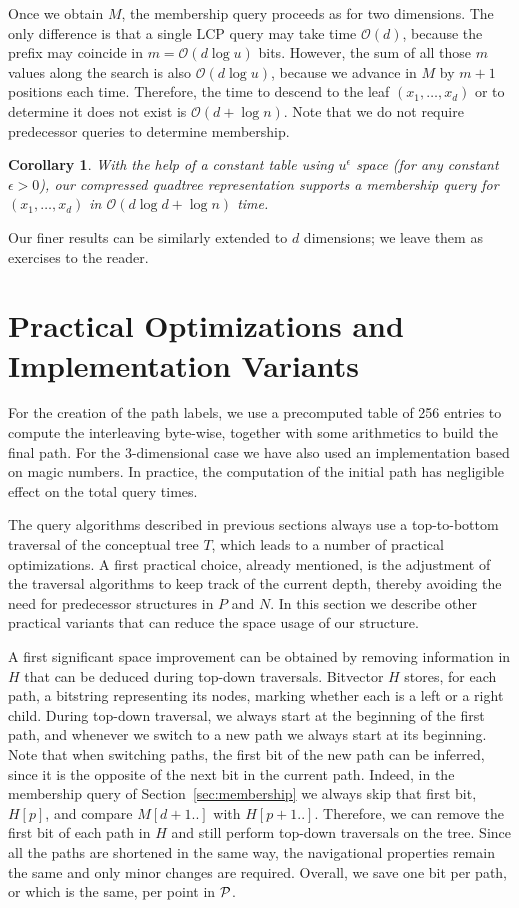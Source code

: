 \documentclass{elsarticle}
\newtheorem{corollary}[theorem]{Corollary}
\newcommand{\Oh}[1]
  {\ensuremath{\mathcal{O}\!\left( {#1} \right)}}
\newcommand{\LCP}{\ensuremath{\mathrm{LCP}}}
\begin{document}
Once we obtain $M$, the membership query proceeds as for two dimensions. The only difference is that a single $\LCP$ query may take time $\Oh{d}$, because the prefix may coincide in $m=\Oh{d\log u}$ bits. However, the sum of all those $m$ values along the search is also $\Oh{d\log u}$, because we advance in $M$ by $m+1$ positions each time. Therefore, the time to descend to the leaf $(x_1,\ldots,x_d)$ or to determine it does not exist is $\Oh{d+\log n}$. Note that we do not require predecessor queries to determine membership.

\begin{corollary}
With the help of a constant table using $u^\epsilon$ space (for any constant $\epsilon>0$), our compressed quadtree representation supports a membership query for \((x_1,\ldots,x_d)\) in \(\Oh{d\log d + \log n}\) time.
\end{corollary}

Our finer results can be similarly extended to $d$ dimensions; we leave them
as exercises to the reader.

\section{Practical Optimizations and Implementation Variants}
\label{sec:practice}

For the creation of the path labels, we use a precomputed table of 256 entries to compute the interleaving byte-wise, together with some arithmetics to build the final path. For the 3-dimensional case we have also used an implementation based on magic numbers. In practice, the computation of the initial path has negligible effect on the total query times.

The query algorithms described in previous sections always use a top-to-bottom traversal of the conceptual tree $T$, which leads to a number of practical optimizations.  A first practical choice, already mentioned, is the adjustment of the traversal algorithms to keep track of the current depth, thereby avoiding the need for predecessor structures in $P$ and $N$. In this section we describe other practical variants that can reduce the space usage of our structure.

A first significant space improvement can be obtained by removing information in $H$ that can be deduced during top-down traversals. Bitvector $H$ stores, for each path, a bitstring representing its nodes, marking whether each is a left or a right child. During top-down traversal, we always start at the beginning of the first path, and whenever we switch to a new path we always start at its beginning. Note that when switching paths, the first bit of the new path can be inferred, since it is the opposite of the next bit in the current path. Indeed, in the membership query of Section~\ref{sec:membership} we always skip that first bit, $H[p]$, and compare $M[d+1..]$ with $H[p+1..]$. Therefore, we can remove the first bit of each path in $H$ and still perform top-down traversals on the tree. Since all the paths are shortened in the same way, the navigational properties remain the same and only minor changes are required. Overall, we save one bit per path, or which is the same, per point in $\cal P$.
\end{document}
